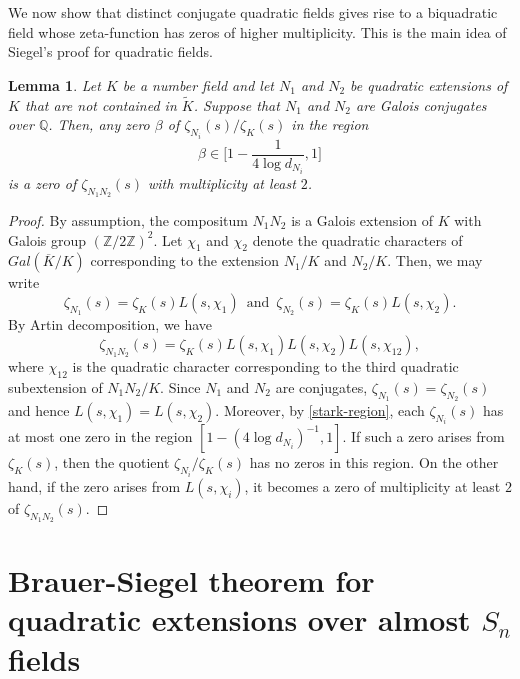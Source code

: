 \documentclass[12pt]{amsart}
\newtheorem{lemma}[theorem]{Lemma}
\theoremstyle{definition}
\newcommand{\Q}{\mathbb{Q}}
\newcommand{\Z}{\mathbb{Z}}
\begin{document}
We now show that distinct conjugate quadratic fields gives rise to a biquadratic field whose zeta-function has zeros of higher multiplicity. This is the main idea of Siegel's proof for quadratic fields.
\begin{lemma}\label{biquad-lemma}
    Let $K$ be a number field and let $N_1$ and $N_2$ be quadratic extensions of $K$ that are not contained in $\widetilde{K}$. Suppose that $N_1$ and $N_2$ are Galois conjugates over $\Q$. Then, any zero $\beta$ of $\zeta_{N_i}(s)/\zeta_K(s)$ in the region
    \begin{equation*}
        \beta \in \bigg[1-\frac{1}{4\log d_{N_i}}, 1\bigg]
    \end{equation*}
    is a zero of $\zeta_{N_1 N_2}(s)$ with multiplicity at least $2$.
\end{lemma}
\begin{proof}
    By assumption, the compositum $N_1 N_2$ is a Galois extension of $K$ with Galois group $(\Z/2\Z)^2$. Let $\chi_1$ and $\chi_2$ denote the quadratic characters of $Gal(\overline{K}/K)$ corresponding to the extension $N_1/K$ and $N_2/K$. Then, we may write
    \begin{equation*}
        \zeta_{N_1}(s) = \zeta_K(s) L(s,\chi_1)\,\,\,\text{and}\,\,\, \zeta_{N_2}(s) = \zeta_K(s) L(s,\chi_2).
    \end{equation*}
    By Artin decomposition, we have
    \begin{equation*}
        \zeta_{N_1 N_2}(s) = \zeta_K(s) L(s,\chi_1) L(s,\chi_2) L(s,\chi_{12}),
    \end{equation*}
    where $\chi_{12}$ is the quadratic character corresponding to the third quadratic subextension of $N_1N_2/K$. Since $N_1$ and $N_2$ are conjugates, $\zeta_{N_1}(s) = \zeta_{N_2}(s)$ and hence $L(s,\chi_1) = L(s,\chi_2)$. Moreover, by \eqref{stark-region}, each $\zeta_{N_i}(s)$ has at most one zero in the region $[1-(4\log d_{N_i})^{-1}, 1]$. If such a zero arises from $\zeta_K(s)$, then the quotient $\zeta_{N_i}/\zeta_K(s)$ has no zeros in this region. On the other hand, if the zero arises from $L(s,\chi_i)$, it becomes a zero of multiplicity at least $2$ of $\zeta_{N_1N_2}(s)$.
\end{proof}


\bigskip

\section{Brauer-Siegel theorem for quadratic extensions over almost $S_n$ fields}
\bigskip
\end{document}
